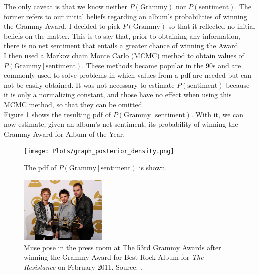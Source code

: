 \documentclass{article}
\begin{document}


The only caveat is that we know neither {\color{ForestGreen} $P(\text{Grammy})$} nor {\color{Brown} $P(\text{sentiment})$}. The former refers to our initial beliefs regarding an album's probabilities of winning the Grammy Award. I decided to pick {\color{ForestGreen} $P(\text{Grammy})$} so that it reflected no initial beliefs on the matter. This is to say that, prior to obtaining any information, there is no net sentiment that entails a greater chance of winning the Award. \\


I then used a Markov chain Monte Carlo (MCMC) method to obtain values of {\color{Salmon} $P( \text{Grammy} \, | \, \text{sentiment} )$}. These methods became popular in the 90s and are commonly used to solve problems in which values from a pdf are needed but can not be easily obtained. It was not necessary to estimate {\color{Brown} $P(\text{sentiment})$} because it is only a normalizing constant, and those have no effect when using this MCMC method, so that they can be omitted. \\

Figure \ref{fig:densities} shows the resulting pdf of {\color{Salmon} $P( \text{Grammy} \, | \, \text{sentiment} )$}. With it, we can now estimate, given an album's net sentiment, its probability of winning the Grammy Award for Album of the Year. \\ 


\begin{figure}[h]
    \centering
    \texttt{[image: Plots/graph\_posterior\_density.png]}
    \caption{The pdf of {\color{Salmon} $P( \text{Grammy} \, | \, \text{sentiment} )$} is shown.}
    \label{fig:densities}
\end{figure}{}

\newpage

\begin{figure}
    \centering
    \includegraphics[width=0.37\textwidth]{Plots/MuseGrammys.jpg}
    \caption*{Muse pose in the press room at The 53rd Grammy Awards after winning the Grammy Award for Best Rock Album for \textit{The Resistance} on February 2011. Source: \href{http://www.zimbio.com/photos/Dominic+Howard/Matt+Bellamy/53rd+Annual+GRAMMY+Awards+Press+Room/Olbz7K-nebK}{}.}
\end{figure}
\end{document}
